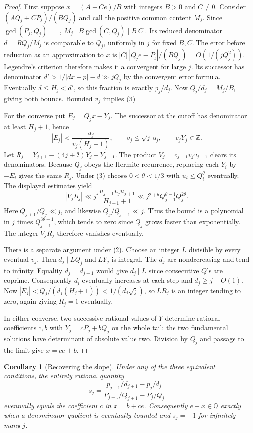 \documentclass[11pt]{amsart}
\newtheorem{corollary}[theorem]{Corollary}
\theoremstyle{definition}
\theoremstyle{remark}
\numberwithin{equation}{section}
\begin{document}
\begin{proof}
First suppose $x=(A+Ce)/B$ with integers $B>0$ and $C\ne0$.
Consider $(AQ_j+CP_j)/(BQ_j)$ and call the positive common content
$M_j$. Since $\gcd(P_j,Q_j)=1$,
$M_j\mid B\gcd(C,Q_j)\mid B|C|$. Its reduced denominator
$d=BQ_j/M_j$ is comparable to $Q_j$, uniformly in $j$ for fixed $B,C$.
The error before reduction as an approximation to $x$ is
$|C|\,|Q_je-P_j|/(BQ_j)=O(1/(jQ_j^2))$. Legendre's criterion
therefore makes it a convergent for large $j$. Its successor has
denominator $d'>1/|dx-p|-d\gg jQ_j$ by the convergent error formula.
Eventually $d\le H_j<d'$, so this fraction is exactly $p_j/d_j$.
Now $Q_j/d_j=M_j/B$, giving both bounds. Bounded $u_j$ implies (3).

For the converse put $E_j=Q_j x-Y_j$. The successor at the cutoff
has denominator at least $H_j+1$, hence
\[
 |E_j|<\frac{u_j}{v_j(H_j+1)},\qquad
 v_j\le\sqrt j\,u_j,\qquad v_jY_j\in\mathbb Z .
\]
Let $R_j=Y_{j+1}-(4j+2)Y_j-Y_{j-1}$. The product
$V_j=v_{j-1}v_jv_{j+1}$ clears its denominators. Because $Q_j$ obeys
the Hermite recurrence, replacing each $Y_i$ by $-E_i$ gives the same
$R_j$. Under (3) choose $0<\theta<1/3$ with $u_i\le Q_i^\theta$
eventually. The displayed estimates yield
\[
 |V_j R_j|\ll j^2
 \frac{u_{j-1}u_ju_{j+1}}{H_{j-1}+1}
 \ll j^{2+\theta}Q_{j-1}^{\theta-1}Q_j^{2\theta}.
\]
Here $Q_{j+1}/Q_j\ll j$, and likewise $Q_j/Q_{j-1}\ll j$.
Thus the bound is a polynomial in $j$ times $Q_{j-1}^{3\theta-1}$,
which tends to zero since $Q_j$ grows faster than exponentially.
The integer $V_jR_j$ therefore vanishes eventually.

There is a separate argument under (2). Choose an integer $L$ divisible
by every eventual $v_j$. Then $d_j\mid LQ_j$ and $LY_j$ is integral.
The $d_j$ are nondecreasing and tend to infinity. Equality
$d_j=d_{j+1}$ would give $d_j\mid L$ since consecutive $Q$'s are
coprime. Consequently $d_j$ eventually increases at each step and
$d_j\ge j-O(1)$. Now $|E_j|<Q_j/(d_j(H_j+1))<1/(d_j\sqrt j)$,
so $LR_j$ is an integer tending to zero, again giving $R_j=0$ eventually.

In either converse, two successive rational values of $Y$ determine
rational coefficients $c,b$ with $Y_j=cP_j+bQ_j$ on the whole tail:
the two fundamental solutions have determinant of absolute value two.
Division by $Q_j$ and passage to the limit give $x=ce+b$.
\end{proof}
\begin{corollary}[Recovering the slope]\label{cor:recover-slope}
Under any of the three equivalent conditions, the entirely rational
quantity
\[
 s_j=\frac{p_{j+1}/d_{j+1}-p_j/d_j}
              {P_{j+1}/Q_{j+1}-P_j/Q_j}
\]
eventually equals the coefficient $c$ in $x=b+ce$. Consequently
$e+x\in\mathbb Q$ exactly when a denominator quotient is eventually
bounded and $s_j=-1$ for infinitely many $j$.
\end{corollary}
\end{document}
